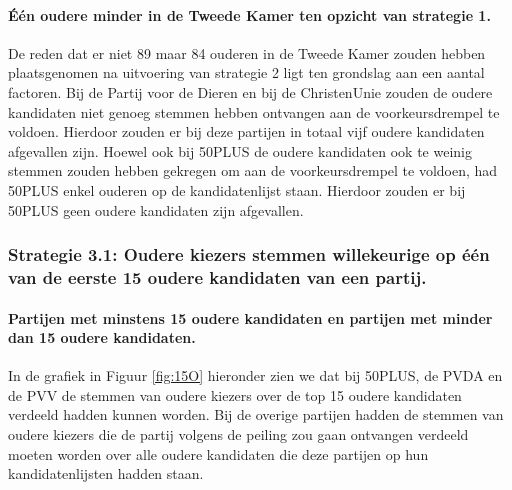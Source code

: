 \paragraph{Één oudere minder in de Tweede Kamer ten opzicht van strategie 1.}
De reden dat er niet 89 maar 84 ouderen in de Tweede Kamer zouden hebben plaatsgenomen na uitvoering van strategie 2 ligt ten grondslag aan een aantal factoren. Bij de Partij voor de Dieren en bij de ChristenUnie zouden de oudere kandidaten niet genoeg stemmen hebben ontvangen aan de voorkeursdrempel te voldoen. Hierdoor zouden er bij deze partijen in totaal vijf oudere kandidaten afgevallen zijn. Hoewel ook bij 50PLUS de oudere kandidaten ook te weinig stemmen zouden hebben gekregen om aan de voorkeursdrempel te voldoen, had 50PLUS enkel ouderen op de kandidatenlijst staan. Hierdoor zouden er bij 50PLUS geen oudere kandidaten zijn afgevallen. 




\subsubsection{Strategie 3.1: Oudere kiezers stemmen willekeurige op één van de eerste 15 oudere kandidaten van een partij.}

\paragraph{Partijen met minstens 15 oudere kandidaten en partijen met minder dan 15 oudere kandidaten.}
In de grafiek in Figuur \ref{fig:15O} hieronder zien we dat bij 50PLUS, de PVDA en de PVV de stemmen van oudere kiezers over de top 15 oudere kandidaten verdeeld hadden kunnen worden. Bij de overige partijen hadden de stemmen van oudere kiezers die de partij volgens de peiling zou gaan ontvangen verdeeld moeten worden over alle oudere kandidaten die deze partijen op hun kandidatenlijsten hadden staan.




